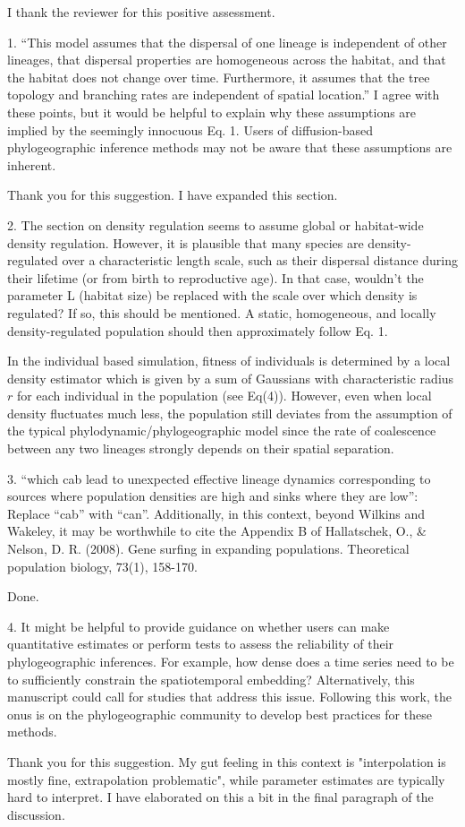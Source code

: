 \documentclass[11pt, oneside]{article}   	%
\newcommand{\response}[1]{{\color{black}{\bf Response:} #1}}
\begin{document}
\response{I thank the reviewer for this positive assessment.}

1.  ``This model assumes that the dispersal of one lineage is independent of other lineages, that dispersal properties are homogeneous across the habitat, and that the habitat does not change over time. Furthermore, it assumes that the tree topology and branching rates are independent of spatial location.'' I agree with these points, but it would be helpful to explain why these assumptions are implied by the seemingly innocuous Eq. 1. Users of diffusion-based phylogeographic inference methods may not be aware that these assumptions are inherent.

\response{Thank you for this suggestion. I have expanded this section.}

2. The section on density regulation seems to assume global or habitat-wide density regulation. However, it is plausible that many species are density-regulated over a characteristic length scale, such as their dispersal distance during their lifetime (or from birth to reproductive age). In that case, wouldn’t the parameter  L  (habitat size) be replaced with the scale over which density is regulated? If so, this should be mentioned. A static, homogeneous, and locally density-regulated population should then approximately follow Eq. 1.

\response{In the individual based simulation, fitness of individuals is determined by a local density estimator which is given by a sum of Gaussians with characteristic radius $r$ for each individual in the population (see Eq(4)). However, even when local density fluctuates much less, the population still deviates from the assumption of the typical phylodynamic/phylogeographic model since the rate of coalescence between any two lineages strongly depends on their spatial separation.}


3. ``which cab lead to unexpected effective lineage dynamics corresponding to sources where population densities are high and sinks where they are low'': Replace ``cab'' with ``can''. Additionally, in this context, beyond Wilkins and Wakeley, it may be worthwhile to cite the Appendix B of Hallatschek, O., \& Nelson, D. R. (2008). Gene surfing in expanding populations. Theoretical population biology, 73(1), 158-170.

\response{Done.}


4. It might be helpful to provide guidance on whether users can make quantitative estimates or perform tests to assess the reliability of their phylogeographic inferences. For example, how dense does a time series need to be to sufficiently constrain the spatiotemporal embedding? Alternatively, this manuscript could call for studies that address this issue. Following this work, the onus is on the phylogeographic community to develop best practices for these methods.

\response{Thank you for this suggestion. My gut feeling in this context is "interpolation is mostly fine, extrapolation problematic", while parameter estimates are typically hard to interpret. I have elaborated on this a bit in the final paragraph of the discussion.}
\end{document}
